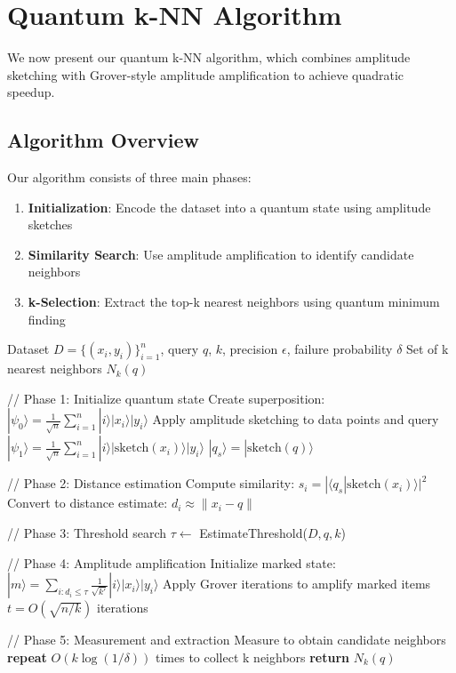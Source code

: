 \documentclass[11pt]{article}
\begin{document}
\section{Quantum k-NN Algorithm}
\label{sec:qknn_algorithm}

We now present our quantum k-NN algorithm, which combines amplitude sketching with Grover-style amplitude amplification to achieve quadratic speedup.

\subsection{Algorithm Overview}

Our algorithm consists of three main phases:

\begin{enumerate}
\item \textbf{Initialization}: Encode the dataset into a quantum state using amplitude sketches
\item \textbf{Similarity Search}: Use amplitude amplification to identify candidate neighbors
\item \textbf{k-Selection}: Extract the top-k nearest neighbors using quantum minimum finding
\end{enumerate}

\begin{algorithm}
\caption{Quantum k-NN}
\label{alg:qknn}
\begin{algorithmic}[1]
\REQUIRE Dataset $D = \{(x_i, y_i)\}_{i=1}^n$, query $q$, $k$, precision $\epsilon$, failure probability $\delta$
\ENSURE Set of k nearest neighbors $N_k(q)$

\STATE // Phase 1: Initialize quantum state
\STATE Create superposition: $|\psi_0\rangle = \frac{1}{\sqrt{n}} \sum_{i=1}^n |i\rangle |x_i\rangle |y_i\rangle$
\STATE Apply amplitude sketching to data points and query
\STATE $|\psi_1\rangle = \frac{1}{\sqrt{n}} \sum_{i=1}^n |i\rangle |\text{sketch}(x_i)\rangle |y_i\rangle$
\STATE $|q_s\rangle = |\text{sketch}(q)\rangle$

\STATE // Phase 2: Distance estimation
    \STATE Compute similarity: $s_i = |\langle q_s | \text{sketch}(x_i) \rangle|^2$
    \STATE Convert to distance estimate: $d_i \approx \|x_i - q\|$
\ENDFOR

\STATE // Phase 3: Threshold search
\STATE $\tau \leftarrow$ EstimateThreshold($D, q, k$) 

\STATE // Phase 4: Amplitude amplification
\STATE Initialize marked state: $|m\rangle = \sum_{i: d_i \leq \tau} \frac{1}{\sqrt{k'}} |i\rangle |x_i\rangle |y_i\rangle$
\STATE Apply Grover iterations to amplify marked items
\STATE $t = O(\sqrt{n/k})$ iterations

\STATE // Phase 5: Measurement and extraction
\STATE Measure to obtain candidate neighbors
\STATE \textbf{repeat} $O(k \log(1/\delta))$ times to collect k neighbors
\STATE \textbf{return} $N_k(q)$
\end{algorithmic}
\end{algorithm}
\end{document}
